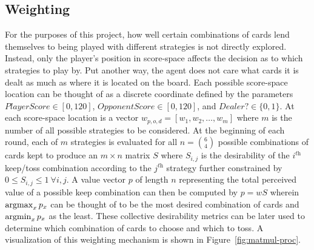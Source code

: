

\subsection{Weighting}
\label{sec:dm-methods-weighting}



For the purposes of this project,
how well certain combinations of cards lend themselves to being played with 
different strategies is not directly explored.
%
Instead, only the player's position in score-space affects the decision as to
which strategies to play by.
%
Put another way, the agent does not care what cards it is dealt as much as where
it is located on the board.
%
Each possible score-space location can be thought of as a discrete coordinate
defined by the parameters
$\textit{PlayerScore} \in [0, 120]$,
$\textit{OpponentScore} \in [0, 120]$,
and
$\textit{Dealer?} \in \{0,1\}$.
%
At each score-space location is a vector $w_{p,o,d} = [w_1,w_2,\ldots,w_m]$
where $m$ is the number of all possible strategies to be considered.
At the beginning of each round, each of $m$ strategies is evaluated for all
$n = {6 \choose 4}$ possible combinations of cards kept to produce an
$m \times n$ matrix $S$
where $S_{i,j}$ is the desirability of the $i^{\textit{th}}$ keep/toss
combination according to the $j^{\textit{th}}$ strategy
further constrained by
$0 \le S_{i,j} \le 1\ \forall i,j$.
%
A value vector $p$ of length $n$ representing the total perceived value of a
possible keep combination
can then be computed by
$p = w S$
wherein $\operatorname*{argmax}_{x}{p_x}$ can be thought of to be the most desired combination
of cards and $\operatorname*{argmin}_{x}{p_x}$ as the least.
%
These collective desirability metrics can be later used to determine which
combination of cards to choose and which to toss.
%
A visualization of this weighting mechanism is shown in
Figure~\ref{fig:matmul-proc}.




